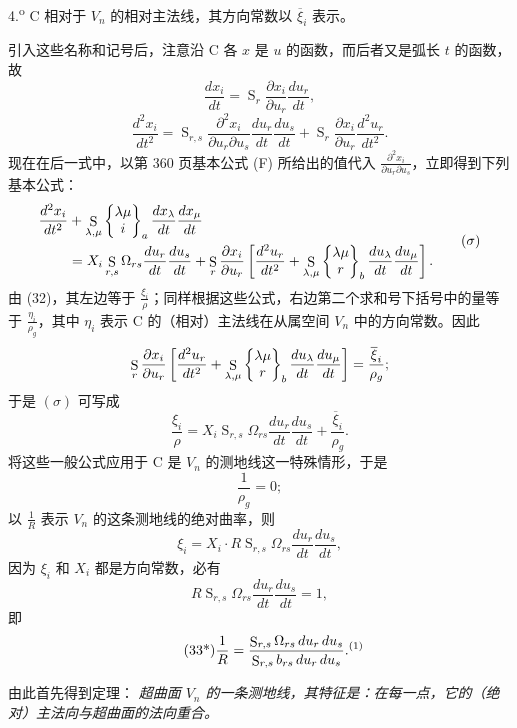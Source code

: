 4.\textsuperscript{o} C 相对于 \(V_n\) 的相对主法线，其方向常数以 \(\overline{\xi}_i\) 表示。

引入这些名称和记号后，注意沿 C 各 \(x\) 是 \(u\) 的函数，而后者又是弧长 \(t\) 的函数，故
\[
 \frac{dx_i}{dt}=\mathop{\mathrm{S}}_r\frac{\partial x_i}{\partial u_r}\frac{du_r}{dt},
\]
\[
 \frac{d^2x_i}{dt^2}=
 \mathop{\mathrm{S}}_{r,s}\frac{\partial^2x_i}{\partial u_r\partial u_s}
 \frac{du_r}{dt}\frac{du_s}{dt}
 +\mathop{\mathrm{S}}_r\frac{\partial x_i}{\partial u_r}\frac{d^2u_r}{dt^2}.
\]
现在在后一式中，以第 360 页基本公式 (F) 所给出的值代入 \(\frac{\partial^2x_i}{\partial u_r\partial u_s}\)，立即得到下列基本公式：
\[
\begin{aligned}
\frac{d^2x_i}{dt^2}
&+\mathop{\mathrm{S}}_{\lambda,\mu}\left\{\begin{matrix}\lambda\mu\\i\end{matrix}\right\}_{a}
 \frac{dx_\lambda}{dt}\frac{dx_\mu}{dt}\\
&=X_i\mathop{\mathrm{S}}_{r,s}\Omega_{rs}\frac{du_r}{dt}\frac{du_s}{dt}
+\mathop{\mathrm{S}}_r\frac{\partial x_i}{\partial u_r}
\left[
\frac{d^2u_r}{dt^2}
+\mathop{\mathrm{S}}_{\lambda,\mu}\left\{\begin{matrix}\lambda\mu\\r\end{matrix}\right\}_{b}
 \frac{du_\lambda}{dt}\frac{du_\mu}{dt}
\right].
\end{aligned}
\tag{$\sigma$}
\]
由 (32)，其左边等于 \(\frac{\xi_i}{\rho}\)；同样根据这些公式，右边第二个求和号下括号中的量等于 \(\frac{\eta_i}{\rho_g}\)，其中 \(\eta_i\) 表示 C 的（相对）主法线在从属空间 \(V_n\) 中的方向常数。因此
\[
 \mathop{\mathrm{S}}_r\frac{\partial x_i}{\partial u_r}
\left[
\frac{d^2u_r}{dt^2}+\mathop{\mathrm{S}}_{\lambda,\mu}\left\{\begin{matrix}\lambda\mu\\r\end{matrix}\right\}_{b}
\frac{du_\lambda}{dt}\frac{du_\mu}{dt}
\right]=\frac{\overline{\xi}_i}{\rho_g};
\]
于是 \((\sigma)\) 可写成
\[
\tag{33}
 \frac{\xi_i}{\rho}
=X_i\mathop{\mathrm{S}}_{r,s}\Omega_{rs}\frac{du_r}{dt}\frac{du_s}{dt}
+\frac{\overline{\xi}_i}{\rho_g}.
\]
将这些一般公式应用于 C 是 \(V_n\) 的测地线这一特殊情形，于是
\[
 \frac1{\rho_g}=0;
\]
以 \(\frac1R\) 表示 \(V_n\) 的这条测地线的绝对曲率，则
\[
 \xi_i=X_i\cdot R\mathop{\mathrm{S}}_{r,s}\Omega_{rs}\frac{du_r}{dt}\frac{du_s}{dt},
\]
因为 \(\xi_i\) 和 \(X_i\) 都是方向常数，必有
\[
 R\mathop{\mathrm{S}}_{r,s}\Omega_{rs}\frac{du_r}{dt}\frac{du_s}{dt}=1,
\]
即
\[
\tag{33*}
 \frac1R=\frac{\mathop{\mathrm{S}}_{r,s}\Omega_{rs}\,du_r\,du_s}
 {\mathop{\mathrm{S}}_{r,s}b_{rs}\,du_r\,du_s}.\srcfnmark{1}
\]

由此首先得到定理：
\emph{超曲面 \(V_n\) 的一条测地线，其特征是：在每一点，它的（绝对）主法向与超曲面的法向重合。}

